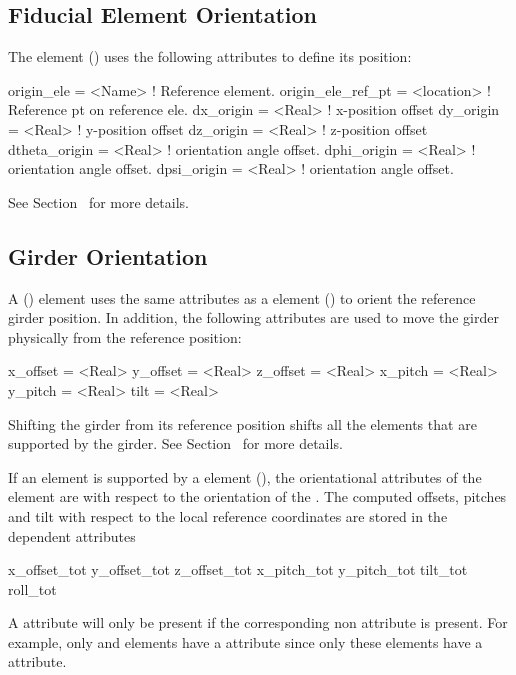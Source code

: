 \subsection{Fiducial Element Orientation}
\label{s:fiducial.orient}

The  element () uses the 
following attributes to define its position:
\begin{example}
  origin_ele        = <Name>     ! Reference element.
  origin_ele_ref_pt = <location> ! Reference pt on reference ele.
  dx_origin         = <Real>     ! x-position offset
  dy_origin         = <Real>     ! y-position offset
  dz_origin         = <Real>     ! z-position offset
  dtheta_origin     = <Real>     ! orientation angle offset.
  dphi_origin       = <Real>     ! orientation angle offset.
  dpsi_origin       = <Real>     ! orientation angle offset.
\end{example}
See Section~ for more details.

\subsection{Girder Orientation}
\label{s:girder.orient}

A  () element uses the same attributes as a  element
() to orient the reference girder position. In addition, the following attributes
are used to move the girder physically from the reference position:
\begin{example}
  x_offset = <Real>
  y_offset = <Real>
  z_offset = <Real>
  x_pitch  = <Real>
  y_pitch  = <Real>
  tilt     = <Real>    
\end{example}
Shifting the girder from its reference position shifts all the elements that are supported by the
girder. See Section~ for more details.

If an element is supported by a  element (), the orientational attributes
of the element are with respect to the orientation of the . The computed offsets, pitches
and tilt with respect to the local reference coordinates are stored in the dependent attributes
\begin{example}
  x_offset_tot
  y_offset_tot
  z_offset_tot
  x_pitch_tot
  y_pitch_tot
  tilt_tot
  roll_tot
\end{example}
A  attribute will only be present if the corresponding non  attribute is
present. For example, only  and  elements have a  attribute since
only these elements have a  attribute.

